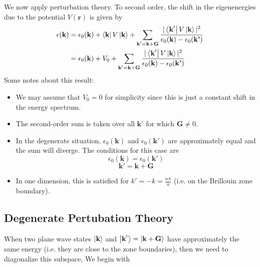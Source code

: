 \documentclass[10pt]{article}
\begin{document}
We now apply perturbation theory. To second order, the shift in the eigenenergies due to the
potential $V(\textbf{r})$ is given by
\begin{equation}
  \begin{aligned}
  \epsilon(\textbf{k}) & = \epsilon_{0}(\textbf{k}) + \bra{\textbf{k}}V\ket{\textbf{k}} + \sum_{\textbf{k}' = \textbf{k} + \textbf{G}}\frac{|\bra{\textbf{k}'}V\ket{\textbf{k}}|^{2}}{\epsilon_{0}(\textbf{k}) - \epsilon_{0}(\textbf{k'})} \\
  & = \epsilon_{0}(\textbf{k}) + V_{0} + \sum_{\textbf{k}' = \textbf{k} + \textbf{G}}\frac{|\bra{\textbf{k}'}V\ket{\textbf{k}}|^{2}}{\epsilon_{0}(\textbf{k}) - \epsilon_{0}(\textbf{k'})}
\end{aligned}
\end{equation}
Some notes about this result:
\begin{itemize}
  \item We may assume that $V_{0} = 0$ for simplicity since this is just a constant shift in the energy spectrum.
  \item The second-order sum is taken over all $\textbf{k}'$ for which $\textbf{G} \neq 0$.
  \item In the degenerate situation, $\epsilon_{0}({\textbf{k}})$ and $\epsilon_{0}({\textbf{k}'})$ are approximately
  equal and the sum will diverge. The conditions for this case are
  $$
     \epsilon_{0}(\textbf{k}) = \epsilon_{0}(\textbf{k}')
  $$
  $$
  \textbf{k}' = \textbf{k} + \textbf{G}
  $$
  \item In one dimension, this is satisfied for $k' = -k = \frac{n\pi}{a}$ (i.e. on the Brillouin zone boundary).
\end{itemize}

\subsection{Degenerate Pertubation Theory}
When two plane wave states $\ket{\textbf{k}}$ and $\ket{\textbf{k}'} = \ket{\textbf{k} + \textbf{G}}$ have approximately
the same energy (i.e. they are close to the zone boundaries), then we need to diagonalize this subspace. We begin with
\end{document}

